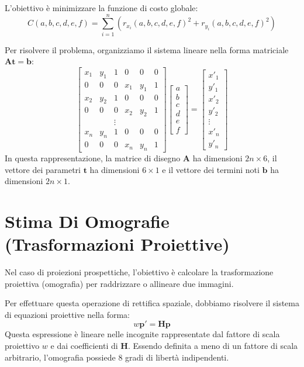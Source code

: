 ﻿\documentclass[11pt, a4paper]{article}
\begin{document}
L'obiettivo è minimizzare la funzione di costo globale:
\[
C(a, b, c, d, e, f) = \sum_{i=1}^{n} \left( r_{x_i}(a, b, c, d, e, f)^2 + r_{y_i}(a, b, c, d, e, f)^2 \right)
\]

Per risolvere il problema, organizziamo il sistema lineare nella forma matriciale $\bm{A}\bm{t} = \bm{b}$:
\[
\begin{bmatrix}
x_1 & y_1 & 1 & 0 & 0 & 0 \\
0 & 0 & 0 & x_1 & y_1 & 1 \\
x_2 & y_2 & 1 & 0 & 0 & 0 \\
0 & 0 & 0 & x_2 & y_2 & 1 \\
& & \vdots & & & \\
x_n & y_n & 1 & 0 & 0 & 0 \\
0 & 0 & 0 & x_n & y_n & 1
\end{bmatrix}
\begin{bmatrix}
a \\
b \\
c \\
d \\
e \\
f
\end{bmatrix}
=
\begin{bmatrix}
x'_1 \\
y'_1 \\
x'_2 \\
y'_2 \\
\vdots \\
x'_n \\
y'_n
\end{bmatrix}
\]
In questa rappresentazione, la matrice di disegno $\bm{A}$ ha dimensioni $2n \times 6$, il vettore dei parametri $\bm{t}$ ha dimensioni $6 \times 1$ e il vettore dei termini noti $\bm{b}$ ha dimensioni $2n \times 1$.

\newpage

\section{Stima Di Omografie (Trasformazioni Proiettive)}

Nel caso di proiezioni prospettiche, l'obiettivo è calcolare la trasformazione proiettiva (omografia) per raddrizzare o allineare due immagini.


Per effettuare questa operazione di rettifica spaziale, dobbiamo risolvere il sistema di equazioni proiettive nella forma:
\[
w\bm{p}' = \bm{H}\bm{p}
\]
Questa espressione è lineare nelle incognite rappresentate dal fattore di scala proiettivo $w$ e dai coefficienti di $\bm{H}$. Essendo definita a meno di un fattore di scala arbitrario, l'omografia possiede $8$ gradi di libertà indipendenti.
\end{document}

